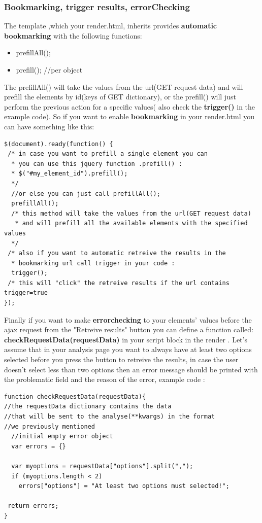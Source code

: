 \documentclass{lhcbnote}
\begin{document}
\subsubsection{Bookmarking, trigger results, errorChecking}

The template ,which your render.html, inherits provides {\bf automatic bookmarking} with the following functions:

\vspace{2 mm}
\begin{itemize}
\item
prefillAll();
\item
prefill(); //per object
\end{itemize}

The prefillAll() will take the values from the url(GET request data) and will prefill the elements by id(keys of GET dictionary), or the prefill()
will just perform the previous action for a specific values( also check the {\bf trigger()} in the example code).
So if you want to enable {\bf bookmarking } in your render.html you can have something like this:

\begin{verbatim}
$(document).ready(function() {
 /* in case you want to prefill a single element you can 
  * you can use this jquery function .prefill() :
  * $("#my_element_id").prefill();
  */
  //or else you can just call prefillAll();  
  prefillAll(); 
  /* this method will take the values from the url(GET request data)
   * and will prefill all the available elements with the specified values
  */
 /* also if you want to automatic retreive the results in the 
  * bookmarking url call trigger in your code :
  trigger();
 /* this will "click" the retreive results if the url contains trigger=true
});
\end{verbatim}

Finally if you want to make {\bf errorchecking} to your elements' values before the ajax request from the "Retreive results" button you
can define a function called: {\bf checkRequestData(requestData)} in your script block in the render . Let's assume that in your analysis
page you want to always have at least two options selected before you press the button to retreive the results, in case the user doesn't
select less than two options then an error message should be printed with the problematic field and the reason of the error, example code :

\begin{verbatim}
function checkRequestData(requestData){
//the requestData dictionary contains the data 
//that will be sent to the analyse(**kwargs) in the format
//we previously mentioned
  //initial empty error object
  var errors = {}
 
  var myoptions = requestData["options"].split(",");
  if (myoptions.length < 2)
    errors["options"] = "At least two options must selected!";

 return errors;
}
\end{verbatim}
\end{document}
